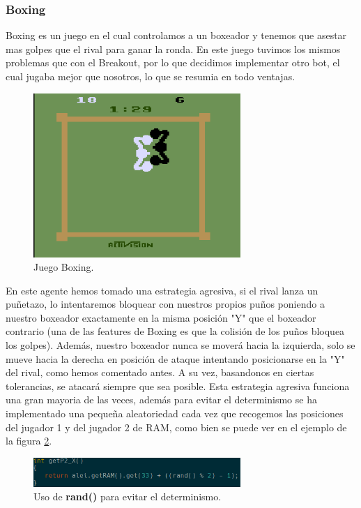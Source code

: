 \subsubsection{Boxing}
\label{subsec:botsbasicos:boxing}
Boxing es un juego en el cual controlamos a un boxeador y tenemos que asestar mas golpes que el rival para ganar la ronda. En este juego tuvimos los mismos problemas que con el Breakout, por lo que decidimos implementar otro bot, el cual jugaba mejor que nosotros, lo que se resumia en todo ventajas.

\begin{figure}[h]
	\centering
	\includegraphics[width=0.7\textwidth]{Figures/boxing}
	\caption{Juego Boxing.}
	\label{fig:boxing}
\end{figure}

En este agente hemos tomado una estrategia agresiva, si el rival lanza un puñetazo, lo intentaremos bloquear con nuestros propios puños poniendo a nuestro boxeador exactamente en la misma posición "Y" que el boxeador contrario (una de las features de Boxing es que la colisión de los puños bloquea los golpes). Además, nuestro boxeador nunca se moverá hacia la izquierda, solo se mueve hacia la derecha en posición de ataque intentando posicionarse en la "Y" del rival, como hemos comentado antes. A su vez, basandonos en ciertas tolerancias, se atacará siempre que sea posible. Esta estrategia agresiva funciona una gran mayoria de las veces, además para evitar el determinismo se ha implementado una pequeña aleatoriedad cada vez que recogemos las posiciones del jugador 1 y del jugador 2 de RAM, como bien se puede ver en el ejemplo de la figura \ref{fig:boxingAleatoriedad}.

\begin{figure}[h]
	\centering
	\includegraphics[width=0.7\textwidth]{Figures/boxingAleatoriedad}
	\caption{Uso de \textbf{rand()} para evitar el determinismo.}
	\label{fig:boxingAleatoriedad}
\end{figure}

